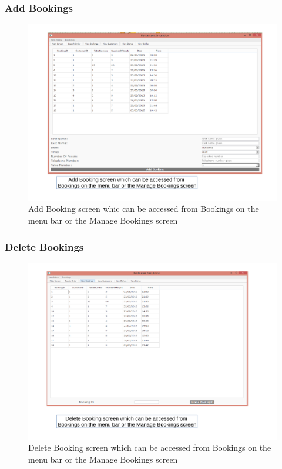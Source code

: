 \begin{landscape}
\subsubsection{Add Bookings}
\begin{figure}[H]
    \includegraphics[width = 15cm]{./Maintenance/images/screen3}
    \caption{Add Booking screen whic can be accessed from Bookings on the menu bar or the Manage Bookings screen} \label{fig:screen3}
\end{figure}

\subsubsection{Delete Bookings}
\begin{figure}[H]
    \includegraphics[width = 15cm]{./Maintenance/images/screen4}
    \caption{Delete Booking screen which can be accessed from Bookings on the menu bar or the Manage Bookings screen} \label{fig:screen4}
\end{figure}


\end{landscape}
